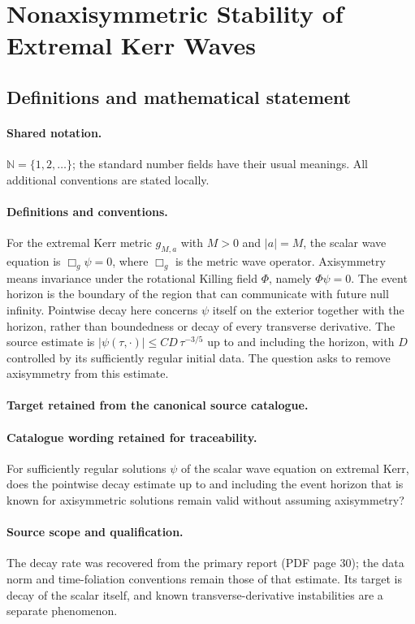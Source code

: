 \documentclass[11pt]{article}
\begin{document}
\section{Nonaxisymmetric Stability of Extremal Kerr Waves}\label{statement}

\subsection{Definitions and mathematical statement}

\paragraph{Shared notation.}$\mathbb N=\{1,2,\ldots\}$; the standard number fields have their usual meanings. All additional conventions are stated locally.


\paragraph{Definitions and conventions.}
For the extremal Kerr metric $g_{M,a}$ with $M>0$ and $|a|=M$, the scalar wave equation is $\Box_g\psi=0$, where $\Box_g$ is the metric wave operator. Axisymmetry means invariance under the rotational Killing field $\Phi$, namely $\Phi\psi=0$. The event horizon is the boundary of the region that can communicate with future null infinity. Pointwise decay here concerns $\psi$ itself on the exterior together with the horizon, rather than boundedness or decay of every transverse derivative. The source estimate is $|\psi(\tau,\cdot)|\leq CD\,\tau^{-3/5}$ up to and including the horizon, with $D$ controlled by its sufficiently regular initial data. The question asks to remove axisymmetry from this estimate.

\paragraph{Target retained from the canonical source catalogue.}
\paragraph{Catalogue wording retained for traceability.}
For sufficiently regular solutions $\psi$ of the scalar wave equation on extremal Kerr, does the pointwise decay estimate up to and including the event horizon that is known for axisymmetric solutions remain valid without assuming axisymmetry?

\paragraph{Source scope and qualification.}
The decay rate was recovered from the primary report (PDF page 30); the data norm and time-foliation conventions remain those of that estimate. Its target is decay of the scalar itself, and known transverse-derivative instabilities are a separate phenomenon.
\end{document}
